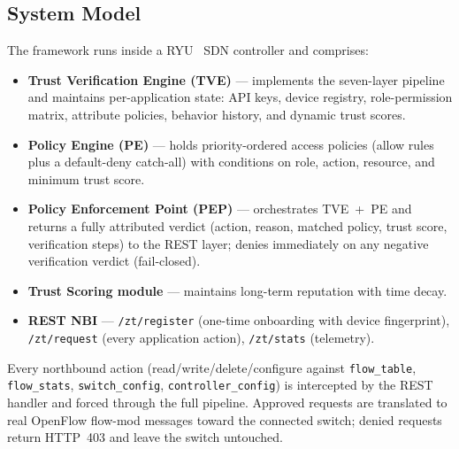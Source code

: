 \documentclass[journal]{IEEEtran}
\begin{document}
\subsection{System Model}
The framework runs inside a RYU~\cite{ryu} SDN controller and comprises:
\begin{itemize}
\item \textbf{Trust Verification Engine (TVE)} --- implements the seven-layer pipeline and maintains per-application state: API keys, device registry, role-permission matrix, attribute policies, behavior history, and dynamic trust scores.
\item \textbf{Policy Engine (PE)} --- holds priority-ordered access policies (allow rules plus a default-deny catch-all) with conditions on role, action, resource, and minimum trust score.
\item \textbf{Policy Enforcement Point (PEP)} --- orchestrates TVE~+~PE and returns a fully attributed verdict (action, reason, matched policy, trust score, verification steps) to the REST layer; denies immediately on any negative verification verdict (fail-closed).
\item \textbf{Trust Scoring module} --- maintains long-term reputation with time decay.
\item \textbf{REST NBI} --- \texttt{/zt/register} (one-time onboarding with device fingerprint), \texttt{/zt/request} (every application action), \texttt{/zt/stats} (telemetry).
\end{itemize}
Every northbound action (read/write/delete/configure against \texttt{flow\_table}, \texttt{flow\_stats}, \texttt{switch\_config}, \texttt{controller\_config}) is intercepted by the REST handler and forced through the full pipeline. Approved requests are translated to real OpenFlow flow-mod messages toward the connected switch; denied requests return HTTP~403 and leave the switch untouched.
\end{document}
